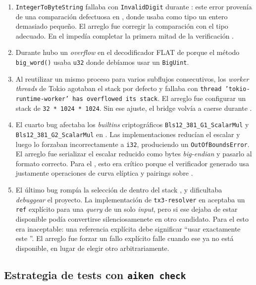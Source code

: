\begin{enumerate}[itemsep=0.1cm]
  \item \texttt{IntegerToByteString} fallaba con \texttt{InvalidDigit} durante \PhaseOneSetupTx: este error provenía de una comparación defectuosa en \UplcTurbo, donde usaba como tipo un entero demasiado pequeño. El arreglo fue corregir la comparación con el tipo adecuado. En el \zkBridge impedía completar la primera mitad de la verificación \STM.

  \item Durante \PhaseOneSetupTx hubo un \textit{overflow} en el decodificador FLAT de \UplcTurbo porque el método \texttt{big\_word()} usaba \texttt{u32} donde debíamos usar un \texttt{BigUint}.

  \item Al reutilizar un mismo proceso para varios subflujos consecutivos, los \textit{worker threads} de Tokio agotaban el stack por defecto y \Dolos fallaba con \texttt{thread 'tokio-runtime-worker' has overflowed its stack}. El arreglo fue configurar un stack de \texttt{32 * 1024 * 1024}. Sin ese ajuste, el bridge volvía a caerse durante \PhaseOneSetupTx.

  \item El cuarto bug afectaba los \textit{builtins} criptográficos \texttt{Bls12\_381\_G1\_ScalarMul} y \texttt{Bls12\_381\_G2\_ScalarMul} en \UplcTurbo. Las implementaciones reducían el escalar y luego lo forzaban incorrectamente a \texttt{i32}, produciendo un \texttt{OutOfBoundsError}. El arreglo fue serializar el escalar reducido como bytes \textit{big-endian} y pasarlo al formato correcto. Para el \zkBridge, esto era crítico porque el verificador \STM generado usa justamente operaciones de curva elíptica y pairings sobre \BLS.

  \item El último bug rompía la selección de \UTxOs dentro del stack \TxThree, y dificultaba \textit{debuggear} el proyecto. La implementación de \texttt{tx3-resolver} en \Dolos aceptaba un \texttt{ref} explícito para una \textit{query} de un solo \textit{input}, pero si ese \UTxO dejaba de estar disponible podía convertirse silenciosamenete en otro candidato. Para el \zkBridge esto era inaceptable: una referencia explícita debe significar ``usar exactamente este \UTxO''. El arreglo fue forzar un fallo explícito falle cuando ese \UTxO ya no está disponible, en lugar de elegir otro arbitrariamente.
\end{enumerate}

\subsection{Estrategia de tests con \texttt{aiken check}}

